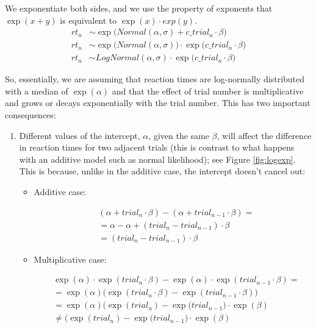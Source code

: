 \documentclass[12pt,]{krantz}
\theoremstyle{definition}
\theoremstyle{definition}
\theoremstyle{definition}
\theoremstyle{remark}
\begin{document}
We exponentiate both sides, and we use the property of exponents that \(\exp(x+y)\) is equivalent to \(\exp(x) \cdot exp(y)\).
\begin{equation}
\begin{aligned}
rt_n &\sim \exp \big(Normal(\alpha, \sigma)  + c\_trial_n \cdot \beta\big) \\
rt_n &\sim \exp\big(Normal(\alpha, \sigma)\big)   \cdot \exp\big(c\_trial_n \cdot \beta\big) \\
rt_n &\sim LogNormal(\alpha, \sigma)   \cdot \exp\big(c\_trial_n \cdot \beta\big) 
\end{aligned}
\end{equation}

So, essentially, we are assuming that reaction times are log-normally distributed with a median of \(\exp(\alpha)\) and that the effect of trial number is multiplicative and grows or decays exponentially with the trial number. This has two important consequences:

\begin{enumerate}
\def\labelenumi{\arabic{enumi}.}
\item
  Different values of the intercept, \(\alpha\), given the same \(\beta\), will affect the difference in reaction times for two adjacent trials (this is contrast to what happens with an additive model such as normal likelihood); see Figure \ref{fig:logexp}. This is because, unlike in the additive case, the intercept doesn't cancel out:

  \begin{itemize}
  \item
    Additive case:

    \begin{equation}
    \begin{aligned}
    & (\alpha + trial_n \cdot \beta) - (\alpha + trial_{n-1} \cdot \beta) = \\
    &=\alpha -\alpha + ( trial_n - trial_{n-1} ) \cdot \beta\\
    &= ( trial_n - trial_{n-1} ) \cdot \beta
    \end{aligned}
    \end{equation}
  \item
    Multiplicative case:

    \begin{equation}
    \begin{aligned}
       &\exp(\alpha) \cdot \exp(trial_n \cdot \beta) -\exp(\alpha) \cdot \exp(trial_{n-1} \cdot \beta) =\\ 
       &= \exp(\alpha) \big(\exp(trial_n  \cdot \beta)  - \exp(trial_{n-1}\cdot \beta) \big)\\
       &= \exp(\alpha) \big(\exp(trial_n)  - \exp(trial_{n-1}  \big) \cdot \exp(\beta)\\
       &\neq \big(\exp(trial_n)  - \exp(trial_{n-1}  \big) \cdot \exp(\beta) 
    \end{aligned}
       \end{equation}
  \end{itemize}
\end{enumerate}
\end{document}
